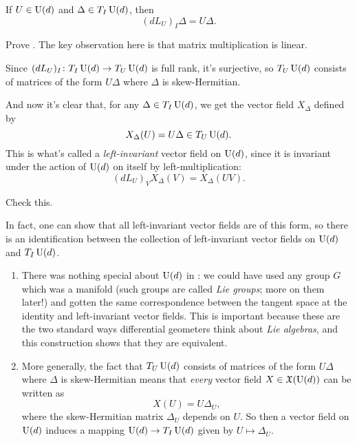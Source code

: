\begin{example}
	\begin{lemma}\label{lem:differential of left multiplication}
		If $U \in \operatorname{U}(d)$ and $\Delta \in T_I \operatorname{U}(d)$, then
		\[
			(d L_U)_I \Delta = U \Delta.
		\]
	\end{lemma}
	
	\begin{exercise}
		Prove . The key observation here is that matrix multiplication is linear.
	\end{exercise}
	
	Since $(d L_U)_I \colon\thinspace\! T_I \operatorname{U}(d) \to T_U \operatorname{U}(d)$ is full rank, it's surjective, so $T_U \operatorname{U}(d)$ consists of matrices of the form $U \Delta$ where $\Delta$ is skew-Hermitian.
	
	
	And now it's clear that, for any $\Delta \in T_I \operatorname{U}(d)$, we get the vector field $X_\Delta$ defined by
	\[
		X_\Delta(U) = U\Delta \in T_U \operatorname{U}(d).
	\]
	This is what's called a \emph{left-invariant} vector field on $\operatorname{U}(d)$, since it is invariant under the action of $\operatorname{U}(d)$ on itself by left-multiplication:
	\[
		(d L_U)_V X_\Delta(V) = X_\Delta(UV).
	\]
	
	\begin{exercise}
		Check this.
	\end{exercise}
	
	In fact, one can show that all left-invariant vector fields are of this form, so there is an identification between the collection of left-invariant vector fields on $\operatorname{U}(d)$ and $T_I \operatorname{U}(d)$.
\end{example}

\begin{remark}
	\begin{enumerate}
		\item There was nothing special about $\operatorname{U}(d)$ in : we could have used any group $G$ which was a manifold (such groups are called \emph{Lie groups}; more on them later!) and gotten the same correspondence between the tangent space at the identity and left-invariant vector fields. This is important because these are the two standard ways differential geometers think about \emph{Lie algebras}, and this construction shows that they are equivalent.
		
		\item More generally, the fact that $T_U \operatorname{U}(d)$ consists of matrices of the form $U \Delta$ where $\Delta$ is skew-Hermitian means that \emph{every} vector field $X \in \mathfrak{X}(\operatorname{U}(d))$ can be written as
		\[
			X(U) = U \Delta_U,
		\]
		where the skew-Hermitian matrix $\Delta_U$ depends on $U$. So then a vector field on $\operatorname{U}(d)$ induces a mapping $\operatorname{U}(d) \to T_I \operatorname{U}(d)$ given by $U \mapsto \Delta_U$.
	\end{enumerate}
\end{remark}	
	
